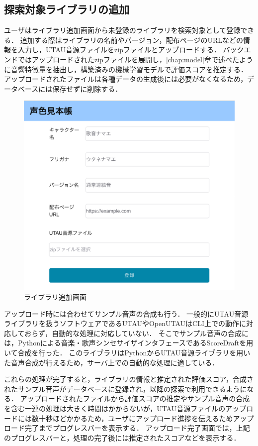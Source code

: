 \subsection{探索対象ライブラリの追加}

ユーザはライブラリ追加画面から未登録のライブラリを検索対象として登録できる．
追加する際はライブラリの名前やバージョン，配布ページのURLなどの情報を入力し，UTAU音源ファイルをzipファイルとアップロードする．
バックエンドではアップロードされたzipファイルを展開し，\ref{chap:model}章で述べたように音響特徴量を抽出し，構築済みの機械学習モデルで評価スコアを推定する．
アップロードされたファイルは各種データの生成後には必要がなくなるため，データベースには保存せずに削除する．

\begin{figure}[htb]
  \centering
  \includegraphics[width=0.9\linewidth]{fig/site_upload_page.png}
  \caption{ライブラリ追加画面}
  \label{fig:site_upload_page}
\end{figure}

アップロード時には合わせてサンプル音声の合成も行う．
一般的にUTAU音源ライブラリを扱うソフトウェアであるUTAUやOpenUTAUはCLI上での動作に対応しておらず，自動的な処理に対応していない．
そこでサンプル音声の合成には，Pythonによる音楽・歌声シンセサイザインタフェースであるScoreDraftを用いて合成を行った．
このライブラリはPythonからUTAU音源ライブラリを用いた音声合成が行えるため，サーバ上での自動的な処理に適している．

これらの処理が完了すると，ライブラリの情報と推定された評価スコア，合成されたサンプル音声がデータベースに登録され，以降の探索で利用できるようになる．
アップロードされたファイルから評価スコアの推定やサンプル音声の合成を含む一連の処理は大きく時間はかからないが，UTAU音源ファイルのアップロードには数十秒ほどかかるため，ユーザにアップロード進捗を伝えるためアップロード完了までプログレスバーを表示する．
アップロード完了画面では，上記のプログレスバーと，処理の完了後には推定されたスコアなどを表示する．

